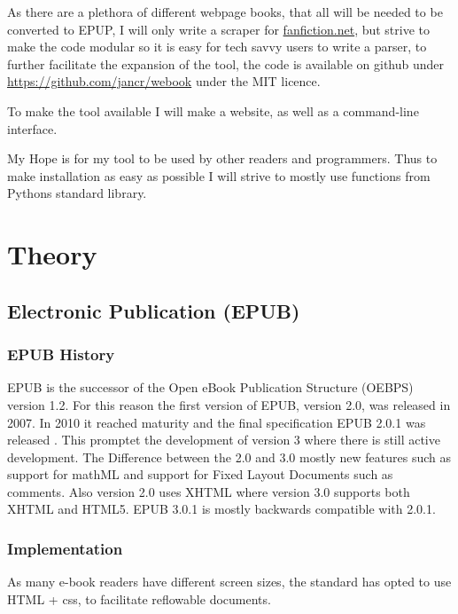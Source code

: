 \documentclass[]{report}   %
\begin{document}
As there are a plethora of different webpage books, that all will be needed to
be converted to EPUP, I will only write a scraper for \url{fanfiction.net}, but
strive to make the code modular so it is easy for tech savvy users to write a
parser, to further facilitate the expansion of the tool, the code is available
on github under \url{https://github.com/jancr/webook} under the MIT licence. 

To make the tool available I will make a website, as well as a command-line
interface.

My Hope is for my tool to be used by other readers and programmers. Thus to
make installation as easy as possible I will strive to mostly use functions
from Pythons standard library.


\chapter{Theory}
\section{Electronic Publication (EPUB)}
\subsection{EPUB History}
EPUB is the successor of the Open eBook Publication Structure (OEBPS) version
1.2. For this reason the first version of EPUB, version 2.0, was released in
2007. In 2010 it reached maturity and the final specification EPUB 2.0.1 was
released . This promptet the development of version 3 where there
is still active development\cite{epub301}. The Difference between the 2.0 and
3.0 mostly new features such as support for mathML and support for Fixed Layout
Documents such as comments\cite{epub2to3}. Also version 2.0 uses XHTML where
version 3.0 supports both XHTML and HTML5. EPUB 3.0.1 is mostly backwards
compatible with 2.0.1\cite{epub2to3}. 

\subsection{Implementation}
As many e-book readers have different screen sizes, the standard has opted to
use HTML + css, to facilitate reflowable documents.
\end{document}
